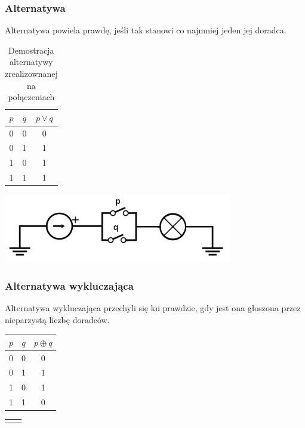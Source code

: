 \documentclass[a4paper,12pt]{article}
\begin{document}
\subsubsection{Alternatywa}
Alternatywa powiela prawdę, jeśli tak stanowi co najmniej jeden jej doradca.

\begin{table}[h!]
\centering

\begin{minipage}{5.5cm}
\centering

\begin{tabular}{ | c | c || c | }
  \hline
  $p$ & $q$ & $p \lor q$ \\ \hline
  0 & 0 & 0 \\
  0 & 1 & 1 \\
  1 & 0 & 1 \\
  1 & 1 & 1 \\
  \hline
\end{tabular}
\end{minipage}
\begin{minipage}{11cm}
   \includegraphics[width=10cm]{grafika/obwody/circuit-or.png}
   \caption*{Demostracja alternatywy zrealizownanej na połączeniach}
\end{minipage}
\end{table}


\newpage

\subsubsection{Alternatywa wykluczająca}
Alternatywa wykluczająca przechyli się ku prawdzie, gdy jest ona głoszona przez nieparzystą liczbę doradców.

\begin{table}[h!]
\centering

\begin{minipage}{5.5cm}
\centering

\begin{tabular}{ | c | c || c | }
  \hline
  $p$ & $q$ & $p \oplus q$ \\ \hline
  0 & 0 & 0 \\
  0 & 1 & 1 \\
  1 & 0 & 1 \\
  1 & 1 & 0 \\
  \hline
\end{tabular}
\end{minipage}
\begin{minipage}{11cm}
\begin{tabular}{  c r }
  & \\
\end{tabular}
\end{minipage}
\end{table}
\end{document}
